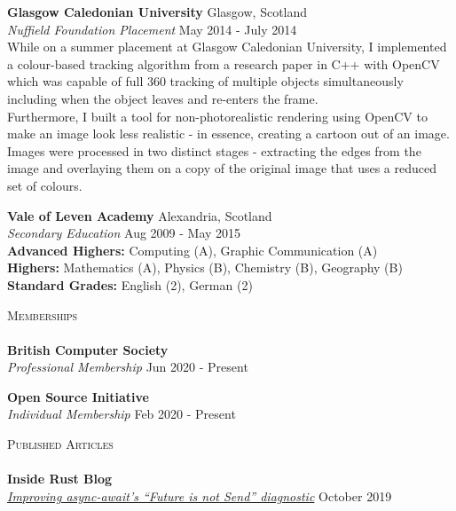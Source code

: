 \documentclass[a4paper]{article}
\newcommand{\lineunder} {
  \vspace*{-8pt} \\
  \hspace*{-18pt} \hrulefill \\
}
\newcommand{\header} [1] {
  {\hspace*{-18pt}\vspace*{6pt} \textsc{#1}}
  \vspace*{-6pt} \lineunder
}
\begin{document}
\textbf{Glasgow Caledonian University} \hfill {\color{gray} Glasgow, Scotland} \\
\textit{Nuffield Foundation Placement} \hfill {\color{gray} May 2014 - July 2014} \\
\vspace{2mm}
While on a summer placement at Glasgow Caledonian University, I implemented a colour-based
tracking algorithm from a research paper in C++ with OpenCV \footnotemark[4] \footnotemark[5] which
was capable of full 360 tracking of multiple objects simultaneously including when the object
leaves and re-enters the frame. \\
\vspace{2mm}
Furthermore, I built a tool for non-photorealistic rendering using OpenCV to make an image look
less realistic - in essence, creating a cartoon out of an image. Images were processed in two
distinct stages - extracting the edges from the image and overlaying them on a copy of the
original image that uses a reduced set of colours.
\vspace{2mm}

\textbf{Vale of Leven Academy} \hfill {\color{gray} Alexandria, Scotland} \\
\textit{Secondary Education} \hfill {\color{gray} Aug 2009 - May 2015} \\
\vspace{2mm}
\textbf{Advanced Highers:} Computing (A), Graphic Communication (A) \\
\textbf{Highers:} Mathematics (A), Physics (B), Chemistry (B), Geography (B) \\
\textbf{Standard Grades:} English (2), German (2)
\vspace{2mm}

\header{Memberships}
\textbf{British Computer Society} \\
\textit{Professional Membership} \hfill {\color{gray} Jun 2020 - Present} \\
\vspace{2mm}

\textbf{Open Source Initiative} \\
\textit{Individual Membership} \hfill {\color{gray} Feb 2020 - Present} \\
\vspace{2mm}

\header{Published Articles}
\textbf{Inside Rust Blog} \\
\textit{\href{https://blog.rust-lang.org/inside-rust/2019/10/11/AsyncAwait-Not-Send-Error-Improvements.html}{Improving async-await's ``Future is not Send'' diagnostic}} \hfill {\color{gray} October 2019} \\
\vspace{2mm}
\end{document}
